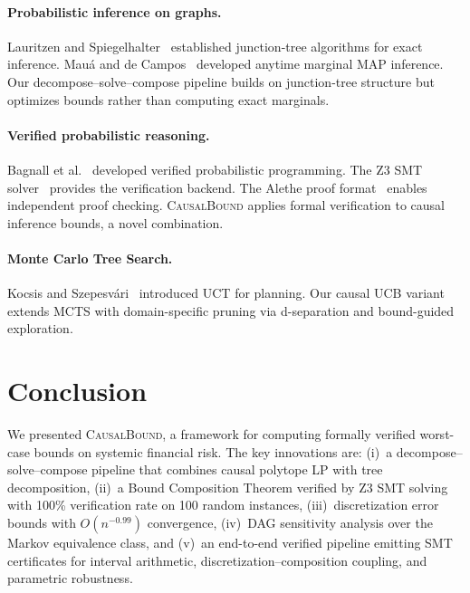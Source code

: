 \documentclass[11pt,a4paper]{article}
\newcommand{\CausalBound}{\textsc{CausalBound}}
\begin{document}
\paragraph{Probabilistic inference on graphs.} Lauritzen and Spiegelhalter~\citep{lauritzen1988local} established junction-tree algorithms for exact inference. Mau\'a and de Campos~\citep{maua2012anytime} developed anytime marginal MAP inference. Our decompose--solve--compose pipeline builds on junction-tree structure but optimizes bounds rather than computing exact marginals.

\paragraph{Verified probabilistic reasoning.} Bagnall et al.~\citep{bagnall2023verified} developed verified probabilistic programming. The Z3 SMT solver~\citep{demoura2008z3} provides the verification backend. The Alethe proof format~\citep{schurr2021alethe} enables independent proof checking. \CausalBound{} applies formal verification to causal inference bounds, a novel combination.

\paragraph{Monte Carlo Tree Search.} Kocsis and Szepesv\'ari~\citep{kocsis2006bandit} introduced UCT for planning. Our causal UCB variant extends MCTS with domain-specific pruning via d-separation and bound-guided exploration.

\section{Conclusion}
\label{sec:conclusion}

We presented \CausalBound{}, a framework for computing formally verified worst-case bounds on systemic financial risk. The key innovations are: (i)~a decompose--solve--compose pipeline that combines causal polytope LP with tree decomposition, (ii)~a Bound Composition Theorem verified by Z3 SMT solving with 100\% verification rate on 100 random instances, (iii)~discretization error bounds with $O(n^{-0.99})$ convergence, (iv)~DAG sensitivity analysis over the Markov equivalence class, and (v)~an end-to-end verified pipeline emitting SMT certificates for interval arithmetic, discretization--composition coupling, and parametric robustness.
\end{document}
